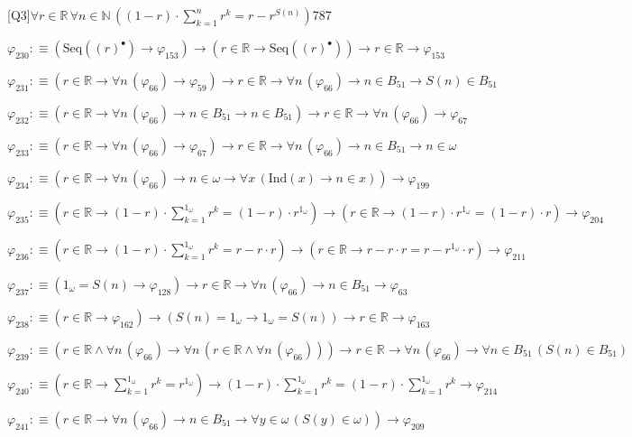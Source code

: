 \begin{fullproof}{[Q3]}{$\forall r \in \mathbb{R}\,\forall n \in \mathbb{N}\,((1 - r) \cdot {\textstyle\sum_{k=1}^{n} {{r}^{k}}} = r - {{r}^{S(n)}})$}{787}
\begin{abbrevlist}
\item $\varphi_{230} :\equiv (\mathrm{Seq}({(r)^{\bullet}}) \to \varphi_{153}) \to (r \in \mathbb{R} \to \mathrm{Seq}({(r)^{\bullet}})) \to r \in \mathbb{R} \to \varphi_{153}$
\item $\varphi_{231} :\equiv (r \in \mathbb{R} \to \forall n\,(\varphi_{66}) \to \varphi_{59}) \to r \in \mathbb{R} \to \forall n\,(\varphi_{66}) \to n \in B_{51} \to S(n) \in B_{51}$
\item $\varphi_{232} :\equiv (r \in \mathbb{R} \to \forall n\,(\varphi_{66}) \to n \in B_{51} \to n \in B_{51}) \to r \in \mathbb{R} \to \forall n\,(\varphi_{66}) \to \varphi_{67}$
\item $\varphi_{233} :\equiv (r \in \mathbb{R} \to \forall n\,(\varphi_{66}) \to \varphi_{67}) \to r \in \mathbb{R} \to \forall n\,(\varphi_{66}) \to n \in B_{51} \to n \in \omega$
\item $\varphi_{234} :\equiv (r \in \mathbb{R} \to \forall n\,(\varphi_{66}) \to n \in \omega \to \forall x\,(\mathrm{Ind}(x) \to n \in x)) \to \varphi_{199}$
\item $\varphi_{235} :\equiv (r \in \mathbb{R} \to (1 - r) \cdot {\textstyle\sum_{k=1}^{1_{\omega}} {{r}^{k}}} = (1 - r) \cdot {{r}^{1_{\omega}}}) \to (r \in \mathbb{R} \to (1 - r) \cdot {{r}^{1_{\omega}}} = (1 - r) \cdot r) \to \varphi_{204}$
\item $\varphi_{236} :\equiv (r \in \mathbb{R} \to (1 - r) \cdot {\textstyle\sum_{k=1}^{1_{\omega}} {{r}^{k}}} = r - r \cdot r) \to (r \in \mathbb{R} \to r - r \cdot r = r - {{r}^{1_{\omega}}} \cdot r) \to \varphi_{211}$
\item $\varphi_{237} :\equiv (1_{\omega} = S(n) \to \varphi_{128}) \to r \in \mathbb{R} \to \forall n\,(\varphi_{66}) \to n \in B_{51} \to \varphi_{63}$
\item $\varphi_{238} :\equiv (r \in \mathbb{R} \to \varphi_{162}) \to (S(n) = 1_{\omega} \to 1_{\omega} = S(n)) \to r \in \mathbb{R} \to \varphi_{163}$
\item $\varphi_{239} :\equiv (r \in \mathbb{R} \land \forall n\,(\varphi_{66}) \to \forall n\,(r \in \mathbb{R} \land \forall n\,(\varphi_{66}))) \to r \in \mathbb{R} \to \forall n\,(\varphi_{66}) \to \forall n \in B_{51}\,(S(n) \in B_{51})$
\item $\varphi_{240} :\equiv (r \in \mathbb{R} \to {\textstyle\sum_{k=1}^{1_{\omega}} {{r}^{k}}} = {{r}^{1_{\omega}}}) \to (1 - r) \cdot {\textstyle\sum_{k=1}^{1_{\omega}} {{r}^{k}}} = (1 - r) \cdot {\textstyle\sum_{k=1}^{1_{\omega}} {{r}^{k}}} \to \varphi_{214}$
\item $\varphi_{241} :\equiv (r \in \mathbb{R} \to \forall n\,(\varphi_{66}) \to n \in B_{51} \to \forall y \in \omega\,(S(y) \in \omega)) \to \varphi_{209}$

\end{abbrevlist}
\end{fullproof}
